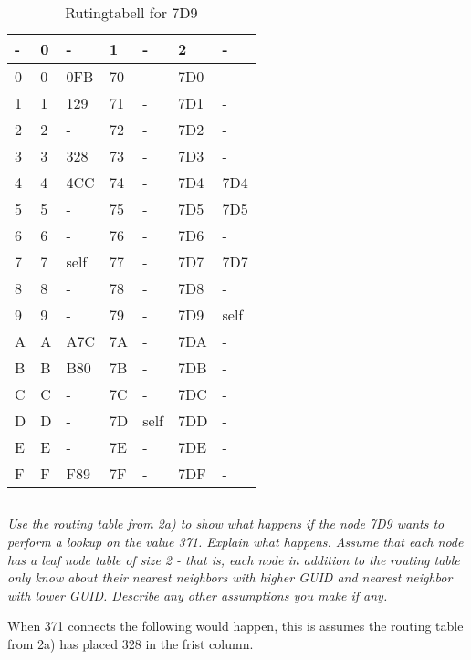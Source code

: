\documentclass{article}
\newcommand{\question}[1]{\subsection{}\textit{#1}\bigskip}
\begin{document}
\begin{table}[ht!]
    \center
    \begin{tabular}{| l | l | l | l | l | l | l |}
    \hline
    - & 0 & -    & 1  & -    & 2   & -    \\
    \hline
    0 & 0 & 0FB  & 70 & -    & 7D0 & -    \\
    \hline
    1 & 1 & 129  & 71 & -    & 7D1 & -    \\
    \hline
    2 & 2 & -    & 72 & -    & 7D2 & -    \\
    \hline
    3 & 3 & 328  & 73 & -    & 7D3 & -    \\
    \hline
    4 & 4 & 4CC  & 74 & -    & 7D4 & 7D4  \\
    \hline
    5 & 5 & -    & 75 & -    & 7D5 & 7D5  \\
    \hline
    6 & 6 & -    & 76 & -    & 7D6 & -    \\
    \hline
    7 & 7 & \cellcolor[gray]{0.8} self & 77 & -    & 7D7 & 7D7  \\
    \hline
    8 & 8 & -    & 78 & -    & 7D8 & -    \\
    \hline
    9 & 9 & -    & 79 & -    & 7D9 & \cellcolor[gray]{0.8} self \\
    \hline
    A & A & A7C  & 7A & -    & 7DA & -    \\
    \hline
    B & B & B80  & 7B & -    & 7DB & -    \\
    \hline
    C & C & -    & 7C & -    & 7DC & -    \\
    \hline
    D & D & -    & 7D & self & 7DD & -    \\
    \hline
    E & E & -    & 7E & -    & 7DE & -    \\
    \hline
    F & F & F89  & 7F & -    & 7DF & -    \\
    \hline
    \end{tabular}
    \caption{Rutingtabell for 7D9}
\end{table}

\newpage
\question{Use the routing table from 2a) to show what happens if the node 7D9 wants to perform a lookup on the value 371. Explain what happens. Assume that each node has a leaf node table of size 2 - that is, each node in addition to the routing table only know about their nearest neighbors with higher GUID and nearest neighbor with lower GUID. Describe any other assumptions you make if any.}

When 371 connects the following would happen, this is assumes the routing table from 2a) has placed 328 in the frist column.
\end{document}
